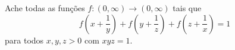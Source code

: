 Ache todas as funções $f:\left(0,\infty\right)\to\left(0,\infty\right)$ tais que \[f\left(x+\frac{1}{y}\right)+f\left(y+\frac{1}{z}\right)+f\left(z+\frac{1}{x}\right)=1\] para todos $x,y,z>0$ com $xyz =1$.
